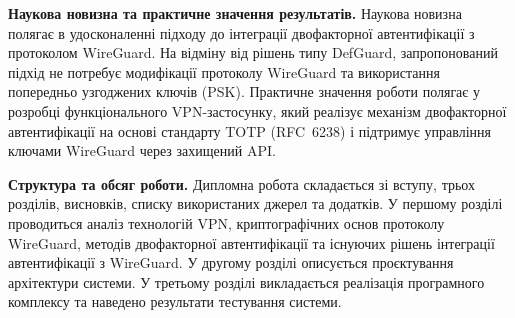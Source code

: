 \textbf{Наукова новизна та практичне значення результатів.}
Наукова новизна полягає в удосконаленні підходу до інтеграції двофакторної
автентифікації з протоколом WireGuard. На відміну від рішень типу DefGuard,
запропонований підхід не потребує модифікації протоколу WireGuard та
використання попередньо узгоджених ключів (PSK).
Практичне значення роботи полягає у розробці функціонального VPN-застосунку,
який реалізує механізм двофакторної автентифікації на основі стандарту TOTP
(RFC~6238) і підтримує управління ключами WireGuard через захищений API.

\textbf{Структура та обсяг роботи.}
Дипломна робота складається зі вступу, трьох розділів, висновків, списку
використаних джерел та додатків. У першому розділі проводиться аналіз
технологій VPN, криптографічних основ протоколу WireGuard, методів двофакторної
автентифікації та існуючих рішень інтеграції автентифікації з WireGuard.
У другому розділі описується проєктування архітектури системи. У третьому розділі
викладається реалізація програмного комплексу та наведено результати тестування системи.

\newpage
